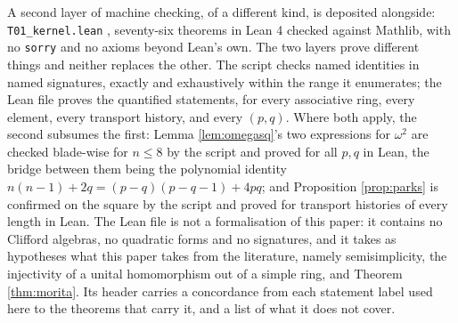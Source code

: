 A second layer of machine checking, of a different kind, is deposited alongside: \texttt{T01\_kernel.lean} \cite{ButlerKernelT01}, seventy-six theorems in Lean 4 checked against Mathlib, with no \texttt{sorry} and no axioms beyond Lean's own. The two layers prove different things and neither replaces the other. The script checks named identities in named signatures, exactly and exhaustively within the range it enumerates; the Lean file proves the quantified statements, for every associative ring, every element, every transport history, and every $(p,q)$. Where both apply, the second subsumes the first: Lemma \ref{lem:omegasq}'s two expressions for $\omega^2$ are checked blade-wise for $n \leq 8$ by the script and proved for all $p,q$ in Lean, the bridge between them being the polynomial identity $n(n-1) + 2q = (p-q)(p-q-1) + 4pq$; and Proposition \ref{prop:parks} is confirmed on the square by the script and proved for transport histories of every length in Lean. The Lean file is not a formalisation of this paper: it contains no Clifford algebras, no quadratic forms and no signatures, and it takes as hypotheses what this paper takes from the literature, namely semisimplicity, the injectivity of a unital homomorphism out of a simple ring, and Theorem \ref{thm:morita}. Its header carries a concordance from each statement label used here to the theorems that carry it, and a list of what it does not cover.

